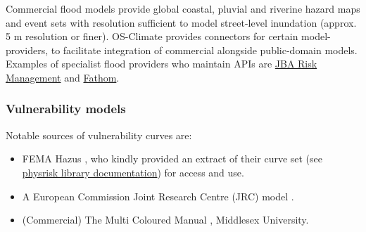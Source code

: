 \documentclass[a4paper,11pt]{extarticle} %
\theoremstyle{definition}
\begin{document}
Commercial flood models provide global coastal, pluvial and riverine hazard maps and event sets with resolution sufficient to model street-level inundation (approx. 5 m resolution or finer). OS-Climate provides connectors for certain model-providers, to facilitate integration of commercial alongside public-domain models. Examples of specialist flood providers who maintain APIs are \href{https://www.jbarisk.com/}{JBA Risk Management} and \href{https://www.fathom.global/}{Fathom}.

\subsubsection{Vulnerability models}

Notable sources of vulnerability curves are:
\begin{itemize}
    \item FEMA Hazus \cite{Hazus}, who kindly provided an extract of their curve set (see \href{https://physrisk.readthedocs.io/en/latest/}{physrisk library documentation}) for access and use.
    \item A European Commission Joint Research Centre (JRC) model \cite{HuizingaEtAl:2017}.
    \item (Commercial) The Multi Coloured Manual \cite{Multicoloured:2025}, Middlesex University.
\end{itemize}
\end{document}
